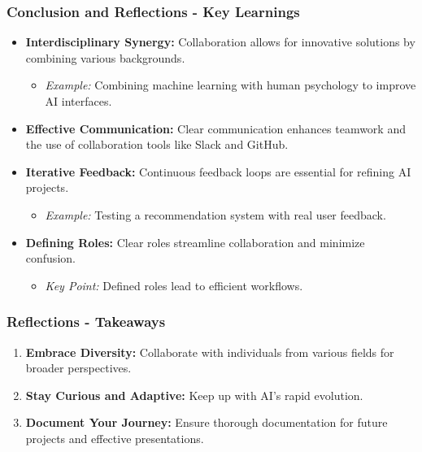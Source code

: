 \documentclass{beamer}
\begin{document}
\begin{frame}[fragile]
    \frametitle{Conclusion and Reflections - Key Learnings}
    
    \begin{itemize}
        \item \textbf{Interdisciplinary Synergy:} 
        Collaboration allows for innovative solutions by combining various backgrounds.
        \begin{itemize}
            \item \textit{Example:} Combining machine learning with human psychology to improve AI interfaces.
        \end{itemize}
        
        \item \textbf{Effective Communication:} 
        Clear communication enhances teamwork and the use of collaboration tools like Slack and GitHub.
        \item \textbf{Iterative Feedback:} 
        Continuous feedback loops are essential for refining AI projects.
        \begin{itemize}
            \item \textit{Example:} Testing a recommendation system with real user feedback.
        \end{itemize}
        
        \item \textbf{Defining Roles:} 
        Clear roles streamline collaboration and minimize confusion.
        \begin{itemize}
            \item \textit{Key Point:} Defined roles lead to efficient workflows.
        \end{itemize}
    \end{itemize}
\end{frame}

\begin{frame}[fragile]
    \frametitle{Reflections - Takeaways}

    \begin{enumerate}
        \item \textbf{Embrace Diversity:} Collaborate with individuals from various fields for broader perspectives.
        \item \textbf{Stay Curious and Adaptive:} Keep up with AI’s rapid evolution.
        \item \textbf{Document Your Journey:} Ensure thorough documentation for future projects and effective presentations.
    \end{enumerate}
\end{frame}
\end{document}
